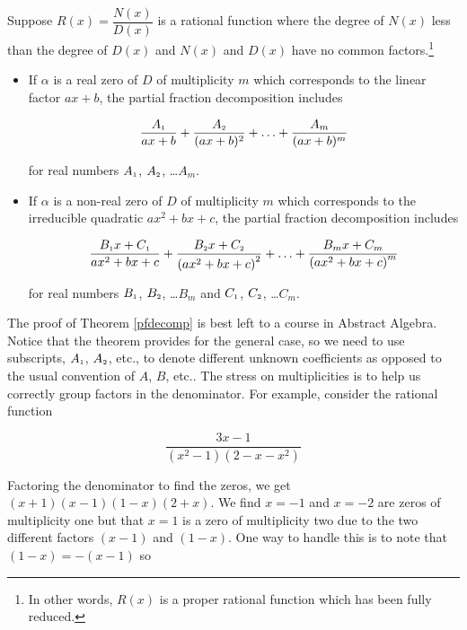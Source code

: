 \documentclass{ximera}
\begin{document}
\begin{theorem}  \label{pfdecomp} Suppose $R(x) = \dfrac{N(x)}{D(x)}$ is a rational function where the degree of $N(x)$ less than the degree of $D(x)$ and $N(x)$ and $D(x)$ have no common factors.\footnote{In other words, $R(x)$ is a proper rational function which has been fully reduced.}

\begin{itemize}

\item  If $\alpha$ is a real zero of $D$ of multiplicity $m$ which corresponds to the linear factor $ax+b$, the partial fraction decomposition includes

\[ \dfrac{A_{\mbox{\tiny$1$}}}{ax+b} + \dfrac{A_{\mbox{\tiny$2$}}}{(ax+b)^2} + \ldots + \dfrac{A_{m}}{(ax+b)^m} \]

for real numbers $A_{\mbox{\tiny$1$}}$, $A_{\mbox{\tiny$2$}}$, \ldots $A_{m}$.

\item  If $\alpha$ is a non-real zero of $D$ of multiplicity $m$ which corresponds to the irreducible quadratic $ax^2+bx+c$, the partial fraction decomposition includes  

\[ \dfrac{B_{\mbox{\tiny$1$}}x + C_{\mbox{\tiny$1$}}}{ax^2+bx+c} + \dfrac{B_{\mbox{\tiny$2$}}x + C_{\mbox{\tiny$2$}}}{\left(ax^2+bx+c\right)^2} + \ldots +\dfrac{B_{m}x + C_{m}}{\left(ax^2+bx+c\right)^m} \]

for real numbers $B_{\mbox{\tiny$1$}}$, $B_{\mbox{\tiny$2$}}$, \ldots $B_{m}$ and $C_{\mbox{\tiny$1$}}$, $C_{\mbox{\tiny$2$}}$, \ldots $C_{m}$. 

\end{itemize}


\end{theorem}



\smallskip

The proof of Theorem \ref{pfdecomp} is best left to a course in Abstract Algebra.  Notice that the theorem provides for the general case, so we need to use subscripts, $A_{\mbox{\tiny$1$}}$, $A_{\mbox{\tiny$2$}}$, etc.,  to denote different unknown coefficients as opposed to the usual convention of $A$, $B$, etc..  The stress on multiplicities is to help us correctly group factors in the denominator.  For example, consider the rational function

\[\dfrac{3x-1}{\left(x^2-1\right)\left(2-x-x^2\right)}\]

Factoring the denominator to find the zeros, we get $(x+1)(x-1)(1-x)(2+x)$.  We find $x = -1$ and $x=-2$ are zeros of multiplicity one but that $x=1$ is a zero of multiplicity two due to the two different factors $(x-1)$ and $(1-x)$.  One way to handle this is to note that $(1-x) = -(x-1)$ so 
\end{document}
